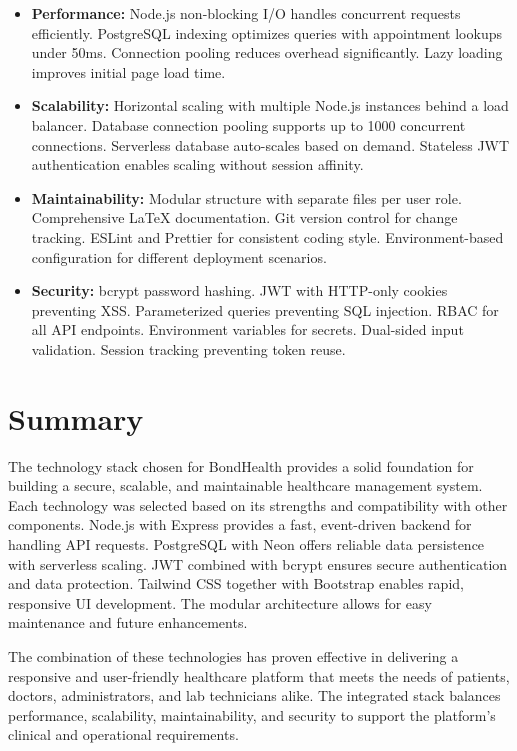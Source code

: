 \begin{itemize}
    \item \textbf{Performance:} Node.js non-blocking I/O handles concurrent requests efficiently. PostgreSQL indexing optimizes queries with appointment lookups under 50ms. Connection pooling reduces overhead significantly. Lazy loading improves initial page load time.

    \item \textbf{Scalability:} Horizontal scaling with multiple Node.js instances behind a load balancer. Database connection pooling supports up to 1000 concurrent connections. Serverless database auto-scales based on demand. Stateless JWT authentication enables scaling without session affinity.

    \item \textbf{Maintainability:} Modular structure with separate files per user role. Comprehensive LaTeX documentation. Git version control for change tracking. ESLint and Prettier for consistent coding style. Environment-based configuration for different deployment scenarios.

    \item \textbf{Security:} bcrypt password hashing. JWT with HTTP-only cookies preventing XSS. Parameterized queries preventing SQL injection. RBAC for all API endpoints. Environment variables for secrets. Dual-sided input validation. Session tracking preventing token reuse.
\end{itemize}

\section{Summary}

\justifying
\noindent The technology stack chosen for BondHealth provides a solid foundation for building a secure, scalable, and maintainable healthcare management system. Each technology was selected based on its strengths and compatibility with other components. Node.js with Express provides a fast, event-driven backend for handling API requests. PostgreSQL with Neon offers reliable data persistence with serverless scaling. JWT combined with bcrypt ensures secure authentication and data protection. Tailwind CSS together with Bootstrap enables rapid, responsive UI development. The modular architecture allows for easy maintenance and future enhancements.

\justifying
\noindent The combination of these technologies has proven effective in delivering a responsive and user-friendly healthcare platform that meets the needs of patients, doctors, administrators, and lab technicians alike. The integrated stack balances performance, scalability, maintainability, and security to support the platform's clinical and operational requirements.